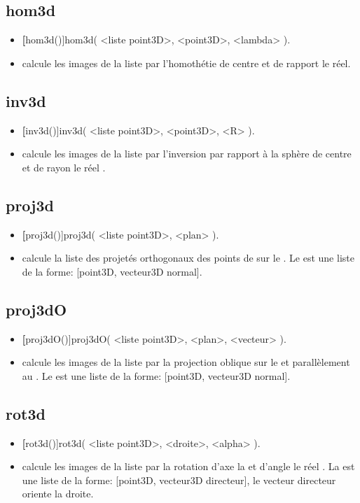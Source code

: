 \subsection{hom3d}
\begin{itemize}
 \item \util \textbf[hom3d()]{hom3d( <liste point3D>, <point3D>, <lambda> )}.
 \item \desc calcule les images de la liste par l'homothétie de centre  et de rapport le réel.
\end{itemize}

\subsection{inv3d}
\begin{itemize}
 \item \util \textbf[inv3d()]{inv3d( <liste point3D>, <point3D>, <R> )}.
 \item \desc calcule les images de la liste par l'inversion par rapport à la sphère de centre  et de rayon le réel .
\end{itemize}

\subsection{proj3d}
\begin{itemize}
 \item \util \textbf[proj3d()]{proj3d( <liste point3D>, <plan> )}.
 \item \desc calcule la liste des projetés orthogonaux des points de  sur le . Le  est une liste de la forme: [point3D, vecteur3D normal].
\end{itemize}

\subsection{proj3dO}
\begin{itemize}
 \item \util \textbf[proj3dO()]{proj3dO( <liste point3D>, <plan>, <vecteur> )}.
 \item \desc calcule les images de la liste par la projection oblique sur le  et parallèlement au . Le  est une liste de la forme: [point3D, vecteur3D normal].
\end{itemize}

\subsection{rot3d}
\begin{itemize}
 \item \util \textbf[rot3d()]{rot3d( <liste point3D>, <droite>, <alpha> )}.
 \item \desc calcule les images de la liste par la rotation d'axe la  et d'angle le réel . La  est une liste de la forme: [point3D, vecteur3D directeur], le vecteur directeur oriente la droite.
\end{itemize}

